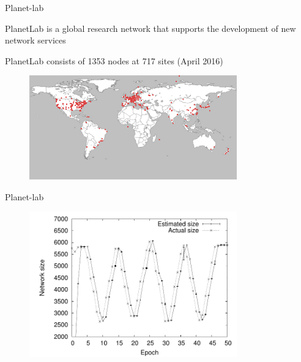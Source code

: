 \begin{frame}{Planet-lab}

\BI
\item PlanetLab is a global research network that supports the development of new network services
\item PlanetLab consists of 1353 nodes at 717 sites (April 2016)
\EI

\begin{figure}
\includegraphics[width=0.80\textwidth]{planetlab}
\end{figure}

\end{frame}


\begin{frame}{Planet-lab}
\begin{figure}
\includegraphics[width=0.80\textwidth]{planet}
\end{figure}


\end{frame}

